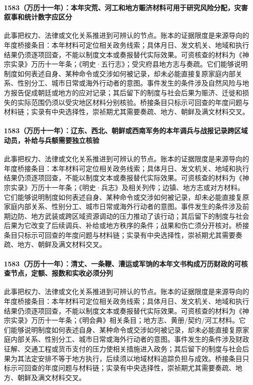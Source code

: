 \paragraph{1583（万历十一年）：本年灾荒、河工和地方赈济材料可用于研究风险分配，灾害叙事和统计数字应区分} 此事把权力、法律或文化关系推进到可辨认的节点。账本的证据限度是来源导向的年度桥接条目：本年材料可定位相关政务线索；具体月日、发文机关、地域和执行结果仍须逐项回查，不能以制度文本或奏报替代实际效果。可资核查的材料为《神宗实录》万历十一年条；《明史·五行志》；受灾府县地方志与奏疏。它们能够说明制度如何表述自身、某种命令或交涉如何被记录，却未必能直接复原家庭内部关系、性别分工、城市日常或海外行动者的意图。事件发生的条件涉及自然风险与地方报告促成朝廷或地方的应对记录；其后留下的制度与社会后果为赈济、迁徙和损失的实际范围仍须以受灾地区材料分别核验。桥接条目只标示可回查的年度问题与材料链；实录有中央选择性，崇祯期尤其需要奏疏、地方、朝鲜及满文材料交叉。

\paragraph{1583（万历十一年）：辽东、西北、朝鲜或西南军务的本年调兵与战报记录跨区域动员，补给与兵额需要独立核验} 此事把权力、法律或文化关系推进到可辨认的节点。账本的证据限度是来源导向的年度桥接条目：本年材料可定位相关政务线索；具体月日、发文机关、地域和执行结果仍须逐项回查，不能以制度文本或奏报替代实际效果。可资核查的材料为《神宗实录》万历十一年条；《明史·兵志》及相关列传；边镇、地方志或对方材料。它们能够说明制度如何表述自身、某种命令或交涉如何被记录，却未必能直接复原家庭内部关系、性别分工、城市日常或海外行动者的意图。事件发生的条件涉及前期边防、地方武装或跨区域资源调动的压力推动了该行动；其后留下的制度与社会后果为它改变了后续调兵、补给或地方秩序的条件；战果和伤亡须分开核对。桥接条目只标示可回查的年度问题与材料链；实录有中央选择性，崇祯期尤其需要奏疏、地方、朝鲜及满文材料交叉。

\paragraph{1583（万历十一年）：清丈、一条鞭、漕运或军饷的本年文书构成万历财政的可核查节点，定额、报数和实收必须分列} 此事把权力、法律或文化关系推进到可辨认的节点。账本的证据限度是来源导向的年度桥接条目：本年材料可定位相关政务线索；具体月日、发文机关、地域和执行结果仍须逐项回查，不能以制度文本或奏报替代实际效果。可资核查的材料为《神宗实录》万历十一年条；《明会典》相关条目；地方志、黄册/契约/河工材料。它们能够说明制度如何表述自身、某种命令或交涉如何被记录，却未必能直接复原家庭内部关系、性别分工、城市日常或海外行动者的意图。事件发生的条件涉及财政征解、交通工程或货币支付的压力使相关措施进入政务；其后留下的制度与社会后果为其法定安排不等于地方执行，后续须以地域材料追踪负担与成效。桥接条目只标示可回查的年度问题与材料链；实录有中央选择性，崇祯期尤其需要奏疏、地方、朝鲜及满文材料交叉。

